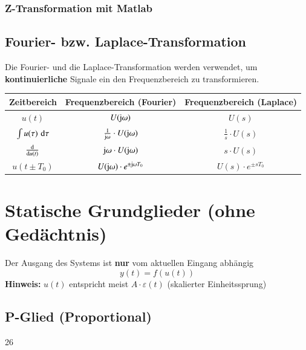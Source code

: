 \subsubsection{Z-Transformation mit Matlab}




\subsection{Fourier- bzw. Laplace-Transformation}

Die Fourier- und die Laplace-Transformation werden verwendet, um \textbf{kontinuierliche} Signale ein den Frequenzbereich zu transformieren.

\begin{center}
    \begin{tabular}{c c c}
        \toprule
        \textbf{Zeitbereich}                  & \textbf{Frequenzbereich (Fourier)}                & \textbf{Frequenzbereich (Laplace)}      \\
        \toprule
        \strut$u(t)$                          & $U(\mathrm{j} \omega)$                                 & $U(s)$                                  \\
        \strut$\int u(\tau) \, \mathop{} \! \mathrm{d} \tau$    & $\frac{1}{\mathrm{j} \omega} \cdot U(\mathrm{j} \omega)$    & $\frac{1}{s} \cdot U(s)$                \\
        \strut$\frac{\mathop{} \! \mathrm{d}}{\mathop{} \! \mathrm{d} u(t)}$      & $\mathrm{j} \omega \cdot U(\mathrm{j} \omega)$              & $s \cdot U(s)$                          \\
        \strut$u(t \pm T_0)$                  & $U(\mathrm{j} \omega) \cdot e^{\pm \mathrm{j} \omega T_0}$  & $U(s) \cdot e^{\pm s T_0}$                          \\
        \bottomrule
    \end{tabular}
\end{center}
\renewcommand{\arraystretch}{1}



\section{Statische Grundglieder (ohne Gedächtnis)}

Der Ausgang des Systems ist \textbf{nur} vom aktuellen Eingang abhängig 
$$ y(t) = f( u(t) ) $$
\textbf{Hinweis:} $u(t)$ entspricht meist $A \cdot \varepsilon(t)$ (skalierter Einheitssprung)


\subsection{P-Glied (Proportional)}{26}


